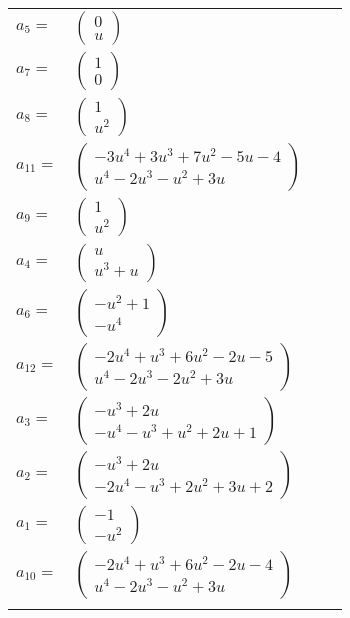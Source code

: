 \documentclass[1p]{elsarticle_modified}
\theoremstyle{definition}
\begin{document}
\begin{tabular}{m{7pt} m{180pt} m{7pt} m{180pt} }
\flushright $a_{5}=$&$\begin{pmatrix}0\\u\end{pmatrix}$ \\
\flushright $a_{7}=$&$\begin{pmatrix}1\\0\end{pmatrix}$ \\
\flushright $a_{8}=$&$\begin{pmatrix}1\\u^2\end{pmatrix}$ \\
\flushright $a_{11}=$&$\begin{pmatrix}-3 u^4+3 u^3+7 u^2-5 u-4\\u^4-2 u^3- u^2+3 u\end{pmatrix}$ \\
\flushright $a_{9}=$&$\begin{pmatrix}1\\u^2\end{pmatrix}$ \\
\flushright $a_{4}=$&$\begin{pmatrix}u\\u^3+u\end{pmatrix}$ \\
\flushright $a_{6}=$&$\begin{pmatrix}- u^2+1\\- u^4\end{pmatrix}$ \\
\flushright $a_{12}=$&$\begin{pmatrix}-2 u^4+u^3+6 u^2-2 u-5\\u^4-2 u^3-2 u^2+3 u\end{pmatrix}$ \\
\flushright $a_{3}=$&$\begin{pmatrix}- u^3+2 u\\- u^4- u^3+u^2+2 u+1\end{pmatrix}$ \\
\flushright $a_{2}=$&$\begin{pmatrix}- u^3+2 u\\-2 u^4- u^3+2 u^2+3 u+2\end{pmatrix}$ \\
\flushright $a_{1}=$&$\begin{pmatrix}-1\\- u^2\end{pmatrix}$ \\
\flushright $a_{10}=$&$\begin{pmatrix}-2 u^4+u^3+6 u^2-2 u-4\\u^4-2 u^3- u^2+3 u\end{pmatrix}$\\&\end{tabular}
\end{document}
